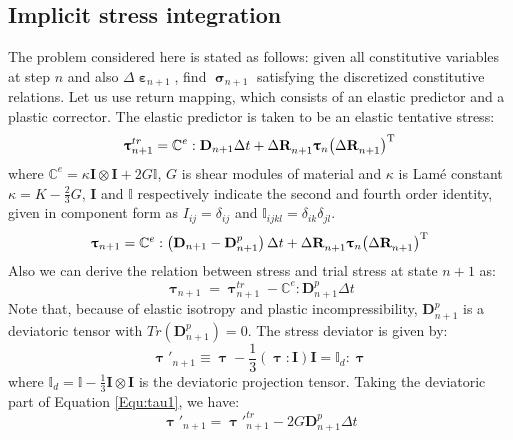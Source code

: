 \subsection{Implicit stress integration}
The problem considered here is stated as follows: given all constitutive variables at step $n$ and also $\Delta {{\bm{\upepsilon }}_{n + 1}}$, find $\bm{\upsigma}_{n+1}$  satisfying the discretized constitutive relations. Let us use return mapping, which consists of an elastic predictor and a plastic corrector. The elastic predictor is taken to be an elastic tentative stress:
\begin{equation}
{\bm{\uptau }}_{n + 1}^{tr} = {\mathbb{C}^e}: {{\mathbf{D}}_{n + 1} \Delta t} + \Delta {\mathbf{R}}_{n + 1}^{}{{\bm{\uptau }}_n}{\left( {\Delta {\mathbf{R}}_{n + 1}^{}} \right)^{\rm{T}}}
\end{equation}
where ${\mathbb{C}^e} = \kappa {\mathbf{I}} \otimes {\mathbf{I}} + 2G\mathbb{I}$, $G$ is shear modules of material and $\kappa$ is Lam\'{e} constant $\kappa  = K - \frac{2}{3}G$, ${\mathbf{I}}$ and $\mathbb{I}$ respectively indicate the second and fourth order identity, given in component form as ${I_{ij}} = {\delta _{ij}}$ and ${\mathbb{I}_{ijkl}} = {\delta _{ik}}{\delta _{jl}}$.
\begin{equation}
{\bm{\uptau }}_{n + 1} = {\mathbb{C}^e}: \left( {\mathbf{D}}_{n + 1} -{\mathbf{D}}_{n + 1}^p \right) \Delta t + \Delta {\mathbf{R}}_{n + 1}^{}{{\bm{\uptau }}_n}{\left( {\Delta {\mathbf{R}}_{n + 1}^{}} \right)^{\rm{T}}}
\end{equation}
Also we can derive the relation between stress and trial stress at state $n+1$ as:
\begin{equation}
\label{Equ:tau1}
{\bm{\uptau }}_{n + 1} = {\bm{\uptau }}_{n + 1}^{tr} - {\mathbb{C}^e}: {\mathbf{D}}_{n + 1}^p \Delta t
\end{equation}
Note that, because of elastic isotropy and plastic incompressibility, ${\mathbf{D}}_{n + 1}^p$ is a deviatoric tensor with $Tr\left( {\mathbf{D}}_{n + 1}^p \right)=0$.
The stress deviator is given by:
\begin{equation}
{\bm{\uptau }}'_{n + 1} \equiv {\bm{\uptau }} - \frac{1}{3}\left( {{\bm{\uptau }}:{\mathbf{I}}} \right){\mathbf{I}} = {\mathbb{I}_d}:{\bm{\uptau }}
\end{equation}
where ${\mathbb{I}_d} = \mathbb{I} - \frac{1}{3}{\mathbf{I}} \otimes {\mathbf{I}}$ is the deviatoric projection tensor.
Taking the deviatoric part of Equation \ref{Equ:tau1}, we have:
\begin{equation}
{\bm{\uptau }}'_{n + 1} = {{\bm{\uptau }}'}_{n + 1}^{tr} - 2G{\mathbf{D}}_{n + 1}^p \Delta t
\end{equation}
